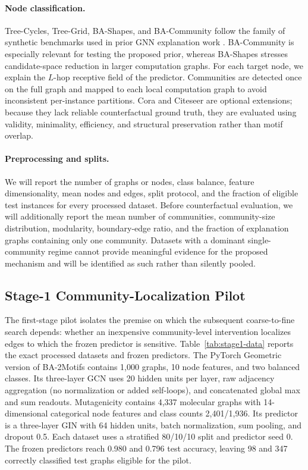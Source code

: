 \documentclass[runningheads]{llncs}
\begin{document}
\paragraph{Node classification.}
Tree-Cycles, Tree-Grid, BA-Shapes, and BA-Community follow the family of
synthetic benchmarks used in prior GNN explanation work
\cite{ying2019gnnexplainer,lucic2022cfgnn}. BA-Community is especially relevant
for testing the proposed prior, whereas BA-Shapes stresses candidate-space
reduction in larger computation graphs. For each target node, we explain the
$L$-hop receptive field of the predictor. Communities are detected once on the
full graph and mapped to each local computation graph to avoid inconsistent
per-instance partitions. Cora and Citeseer are optional extensions; because
they lack reliable counterfactual ground truth, they are evaluated using
validity, minimality, efficiency, and structural preservation rather than
motif overlap.

\paragraph{Preprocessing and splits.}
We will report the number of graphs or nodes, class balance, feature
dimensionality, mean nodes and edges, split protocol, and the fraction of
eligible test instances for every processed dataset. Before counterfactual
evaluation, we will additionally report the mean number of communities,
community-size distribution, modularity, boundary-edge ratio, and the fraction
of explanation graphs containing only one community. Datasets with a dominant
single-community regime cannot provide meaningful evidence for the proposed
mechanism and will be identified as such rather than silently pooled.

\subsection{Stage-1 Community-Localization Pilot}
The first-stage pilot isolates the premise on which the subsequent
coarse-to-fine search depends: whether an inexpensive community-level
intervention localizes edges to which the frozen predictor is sensitive.
Table~\ref{tab:stage1-data} reports the exact processed datasets and frozen
predictors. The PyTorch Geometric version of BA-2Motifs contains 1,000 graphs,
10 node features, and two balanced classes. Its three-layer GCN uses 20 hidden
units per layer, raw adjacency aggregation (no normalization or added
self-loops), and concatenated global max and sum readouts. Mutagenicity
contains 4,337 molecular graphs with 14-dimensional categorical node features
and class counts 2,401/1,936. Its predictor is a three-layer GIN with 64 hidden
units, batch normalization, sum pooling, and dropout 0.5. Each dataset uses a
stratified 80/10/10 split and predictor seed 0. The frozen predictors reach
0.980 and 0.796 test accuracy, leaving 98 and 347 correctly classified test
graphs eligible for the pilot.
\end{document}
